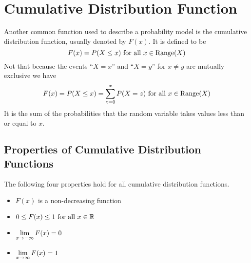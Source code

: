 \section{Cumulative Distribution Function}
Another common function used to describe a probability model is the cumulative distribution function, usually denoted by $F(x)$. It is defined to be
\[
    F(x) = P(X \leq x) \text{ for }\text{all } x\in\operatorname{Range}(X)
\]
Not that because the events ``$X = x$'' and ``$X = y$'' for $x \neq y$ are mutually exclusive we have
\[
    F(x) = P(X \leq x) = \sum_{z = 0}^{x} P(X = z)  \text{ for }\text{all } x\in\operatorname{Range}(X)
\]
It is the sum of the probabilities that the random variable takes values less than or equal to $x$.
\subsection*{Properties of Cumulative Distribution Functions}
The following four properties hold for all cumulative distribution functions.
\begin{itemize}
    \item $F(x)$ is a non-decreasing function
    \item $0 \leq F(x) \leq 1 \text{ for }\text{all } x\in\mathbb{R}$
    \item $\lim\limits_{x \rightarrow -\infty} F(x) = 0$
    \item $\lim\limits_{x \rightarrow \infty} F(x) = 1$
\end{itemize}
